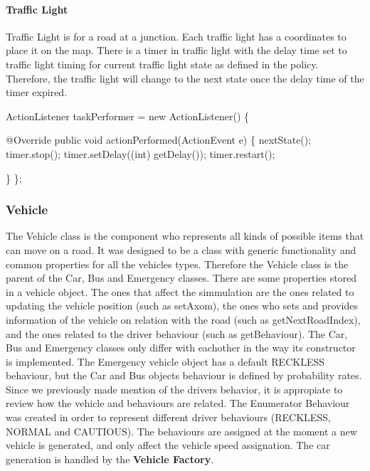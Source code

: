 \documentclass[11pt]{article}
\begin{document}
{\begin{itemize}
\begin{itemize}[noitemsep]
   
    \end{itemize}
    
    \paragraph{Traffic Light}
    Traffic Light is for a road at a junction. Each traffic light has a coordinates to place it on the map. There is  a timer in traffic light with the delay time set to traffic light timing for current traffic light state as defined in the policy. Therefore, the traffic light will change to the next state once the delay time of the timer expired. 
    
    
   
    ActionListener taskPerformer = new ActionListener() \{
   
        @Override \newline
        public void actionPerformed(ActionEvent e) \{ \newline
            nextState();  \newline
            timer.stop();\newline
            timer.setDelay((int) getDelay());\newline
            timer.restart();\newline
            
        \}\newline
        \};\newline
       
    }  
    
    
    
    
    
    
\subsubsection{Vehicle}
The Vehicle class is the component who represents all kinds of possible items that can move on a road. It was designed to be a class with generic functionality and common properties for all the vehicles types. Therefore the Vehicle class is the parent of the Car, Bus and Emergency classes.
There are some properties stored in a vehicle object. The ones that affect the simmulation are the ones related to updating the vehicle position (such as setAxom), the ones who sets and provides information of the vehicle on relation with the road (such as getNextRoadIndex), and the ones related to the driver behaviour (such as getBehaviour).
The Car, Bus and Emergency classes only differ with eachother in the way its constructor is implemented. The Emergency vehicle object has a default RECKLESS behaviour, but the Car and Bus objects behaviour is defined by probability rates.
Since we previously made mention of the drivers behavior, it is appropiate to review how the vehicle and behaviours are related.  The Enumerator Behaviour was created in order to represent different driver behaviours (RECKLESS, NORMAL and CAUTIOUS). The behaviours are assigned at the moment a new vehicle is generated, and only affect the vehicle speed assignation.
The car generation is handled by the \textbf{Vehicle Factory}.
\end{document}

